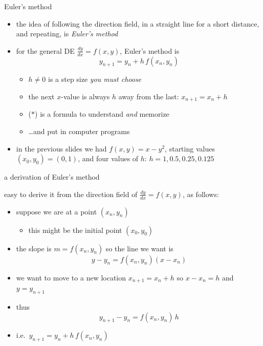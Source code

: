 \documentclass{beamer}
\begin{document}
\begin{frame}{Euler's method}

\begin{itemize}
\item the idea of following the direction field, in a straight line for a short distance, and repeating, is \emph{Euler's method}
\item for the general DE $\frac{dy}{dx} = f(x,y)$, Euler's method is
\begin{equation}
    y_{n+1} = y_n + h\, f(x_n,y_n)   \tag{$\ast$}
\end{equation}

\vspace{-2mm}
    \begin{itemize}
    \item $h\ne 0$ is a step size \emph{you must choose}
    \item the next $x$-value is always $h$ away from the last: $x_{n+1} = x_n + h$
    \item ($\ast$) is a formula to understand \emph{and} memorize
    \item \dots and put in computer programs
    \end{itemize}
\item in the previous slides we had $f(x,y)=x-y^2$, starting values $(x_0,y_0)=(0,1)$, and four values of $h$: $h=1,0.5,0.25,0.125$
\end{itemize}
\end{frame}


\begin{frame}{a derivation of Euler's method}

easy to derive it from the direction field of $\frac{dy}{dx} = f(x,y)$, as follows:
\begin{itemize}
\item suppose we are at a point $(x_n,y_n)$
    \begin{itemize}
    \item this might be the initial point $(x_0,y_0)$
    \end{itemize}
\item the slope is $m=f(x_n,y_n)$ so the line we want is
    $$y-y_n = f(x_n,y_n)(x-x_n)$$
\item we want to move to a new location $x_{n+1}=x_n+h$ so $x-x_n=h$ and $y=y_{n+1}$
\item thus
    $$y_{n+1} - y_n = f(x_n,y_n)\, h$$
\item i.e.~$y_{n+1} = y_n + h\, f(x_n,y_n)$
\end{itemize}
\end{frame}
\end{document}
